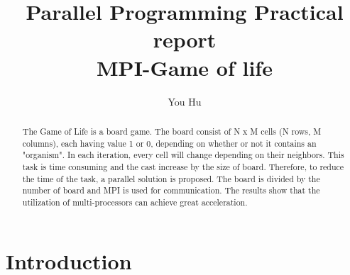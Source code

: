 \documentclass[sigchi]{acmart}
\begin{document}
\title{Parallel Programming Practical report\\
        MPI-Game of life}

\author{You Hu}



\renewcommand{\shortauthors}{You Hu}

\begin{abstract}

The Game of Life is a board game. The board consist of N x M cells (N rows, M columns), each having value 1 or 0, depending on whether or not it contains an "organism". 
In each iteration, every cell will change depending on their neighbors. 
This task is time consuming and the cast increase by the size of board.
Therefore, to reduce the time of the task, a parallel solution is proposed. 
The board is divided by the number of board and MPI is used for communication.
The results show that the utilization of multi-processors can achieve great acceleration. 
 
\end{abstract}




\maketitle

\section{Introduction}
\end{document}
